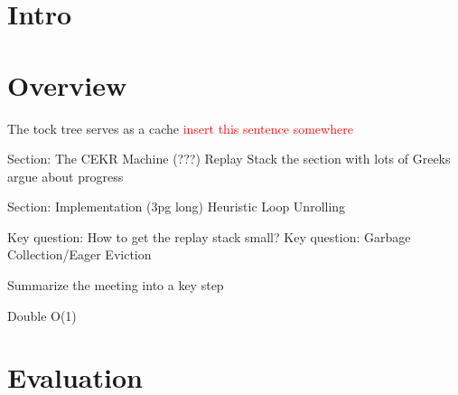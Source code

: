 \documentclass[acmsmall]{acmart}
\newcommand\todo[1]{\textcolor{red}{#1}}
\begin{document}

\maketitle


\section{Intro}

\section{Overview}	
The tock tree serves as a cache \todo{insert this sentence somewhere}

Section: The CEKR Machine (???)
Replay Stack
the section with lots of Greeks
argue about progress

Section: Implementation (3pg long)
Heuristic
Loop Unrolling

Key question: How to get the replay stack small?
Key question: Garbage Collection/Eager Eviction

Summarize the meeting into a key step

Double O(1)




\section{Evaluation}
%
%
%
%
%
%
%

\appendix

\end{document}
